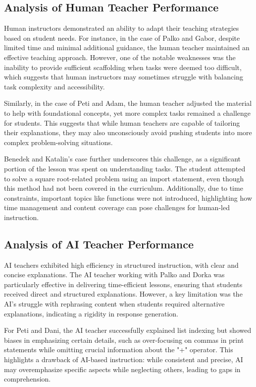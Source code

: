 \documentclass[12pt]{article}  %
\begin{document}
\subsection{Analysis of Human Teacher Performance}
Human instructors demonstrated an ability to adapt their teaching strategies based on student needs. For instance, in the case of Palko and Gabor, despite limited time and minimal additional guidance, the human teacher maintained an effective teaching approach. However, one of the notable weaknesses was the inability to provide sufficient scaffolding when tasks were deemed too difficult, which suggests that human instructors may sometimes struggle with balancing task complexity and accessibility.

Similarly, in the case of Peti and Adam, the human teacher adjusted the material to help with foundational concepts, yet more complex tasks remained a challenge for students. This suggests that while human teachers are capable of tailoring their explanations, they may also unconsciously avoid pushing students into more complex problem-solving situations.

Benedek and Katalin’s case further underscores this challenge, as a significant portion of the lesson was spent on understanding tasks. The student attempted to solve a square root-related problem using an import statement, even though this method had not been covered in the curriculum. Additionally, due to time constraints, important topics like functions were not introduced, highlighting how time management and content coverage can pose challenges for human-led instruction.

\subsection{Analysis of AI Teacher Performance}
AI teachers exhibited high efficiency in structured instruction, with clear and concise explanations. The AI teacher working with Palko and Dorka was particularly effective in delivering time-efficient lessons, ensuring that students received direct and structured explanations. However, a key limitation was the AI’s struggle with rephrasing content when students required alternative explanations, indicating a rigidity in response generation.

For Peti and Dani, the AI teacher successfully explained list indexing but showed biases in emphasizing certain details, such as over-focusing on commas in print statements while omitting crucial information about the "+" operator. This highlights a drawback of AI-based instruction: while consistent and precise, AI may overemphasize specific aspects while neglecting others, leading to gaps in comprehension.
\end{document}

